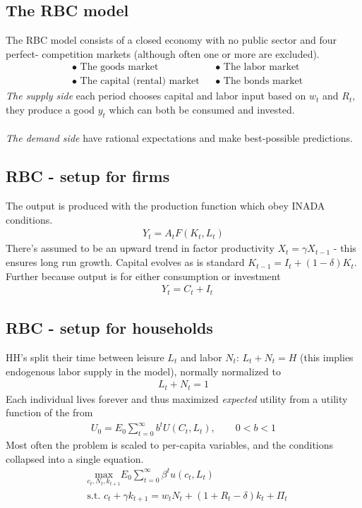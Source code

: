 \documentclass[12pt, a4paper]{article}
\begin{document}
\begin{spacing}{1.213}
\section{The RBC model}
The RBC model consists of a closed economy with no public sector and four perfect- competition markets (although often one or more are excluded).
\begin{align*}
& \bullet \textrm{ The goods market}
&& \bullet \textrm{ The labor market}
\\
& \bullet \textrm{ The capital (rental) market}
&& \bullet \textrm{ The bonds market}
\end{align*}
\textit{The supply side} each period chooses capital and labor input based on $w_t$ and $R_t$, they produce a good $y_t$ which can both be consumed and invested.
\\ \\
\textit{The demand side} have rational expectations and make best-possible predictions.

\subsection{RBC - setup for firms}
The output is produced with the production function which obey INADA conditions. 
\begin{align*}
Y_t = A_t F(K_t, L_t)
\end{align*}
There's assumed to be an upward trend in factor productivity $X_t = \gamma X_{t-1}$ - this ensures long run growth. Capital evolves as is standard $K_{t-1} = I_t + (1-\delta) K_t$. Further because output is for either consumption or investment 
\begin{align*}
& Y_t = C_t + I_t
\end{align*}

\subsection{RBC - setup for households}
HH's split their time between leisure $L_t$ and labor $N_t$: $L_t + N_t = H$ (this implies endogenous labor supply in the model), normally normalized to 
\begin{align*}
L_t + N_t = 1
\end{align*}
Each individual lives forever and thus maximized \textit{expected} utility from a utility function of the from 
\begin{align*}
U_0 = E_0 \sum_{t=0}^{\infty} b^t U(C_t, L_t), \qquad 0<b<1
\end{align*}
Most often the problem is scaled to per-capita variables, and the conditions collapsed into a single equation.
\begin{align*}
&\underset{c_t, N_t, k_{t+1}}{\textrm{max}} E_0 \sum_{t=0}^{\infty} \beta^t u(c_t, L_t) \\
& \textrm{s.t. } c_t + \gamma k_{t+1} = w_t N_t + (1+R_t - \delta)k_t + \Pi_t
\end{align*}



\end{spacing}
\end{document}
